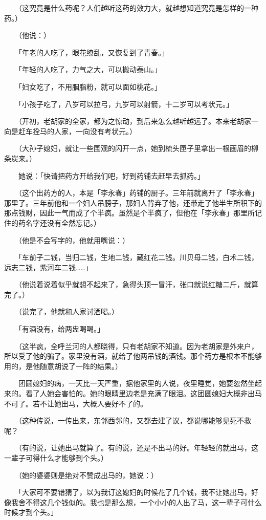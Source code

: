 \documentclass[UTF8]{ctexart}
\begin{document}
　　（这究竟是什么药呢？人们越听这药的效力大，就越想知道究竟是怎样的一种药。）

　　（他说：）

　　「年老的人吃了，眼花缭乱，又恢复到了青春。」

　　「年轻的人吃了，力气之大，可以搬动泰山。」

　　「妇女吃了，不用胭脂粉，就可以面如桃花。」

　　「小孩子吃了，八岁可以拉弓，九岁可以射箭，十二岁可以考状元。」

　　（开初，老胡家的全家，都为之惊动，到后来怎么越听越远了。本来老胡家一向是赶车拴马的人家，一向没有考状元。）

　　（大孙子媳妇，就让一些围观的闪开一点，她到梳头匣子里拿出一根画眉的柳条炭来。）

　　她说：「快请把药方开给我们吧，好到药铺去赶早去抓药。」

　　（这个出药方的人，本是「李永春」药铺的厨子。三年前就离开了「李永春」那里了。三年前他和一个妇人吊膀子，那妇人背弃了他，还带走了他半生所积下的那点钱财，因此一气而成了个半疯。虽然是个半疯了，但他在「李永春」那里所记住的药名字还没有全然忘记。）

　　（他是不会写字的，他就用嘴说：）

　　「车前子二钱，当归二钱，生地二钱，藏红花二钱。川贝母二钱，白术二钱，远志二钱，紫河车二钱……」

　　（他说着说着似乎就想不起来了，急得头顶一冒汗，张口就说红糖二斤，就算完了。）

　　（说完了，他就和人家讨酒喝。）

　　「有酒没有，给两盅喝喝。」

　　（这半疯，全呼兰河的人都晓得，只有老胡家不知道。因为老胡家是外来户，所以受了他的骗了。家里没有酒，就给了他两吊钱的酒钱。那个药方是根本不能够用的，是他随意胡说了一阵的结果。）

　　团圆媳妇的病，一天比一天严重，据他家里的人说，夜里睡觉，她要忽然坐起来的。看了人她会害怕的。她的眼睛里边老是充满了眼泪。这团圆媳妇大概非出马不可了。若不让她出马，大概人要好不了的。

　　（这种传说，一传出来，东邻西邻的，又都去建了议，都说哪能够见死不救呢？

　　（有的说，让她出马就算了。有的说，还是不出马的好。年轻轻的就出马，这一辈子可得什么才能够到个头。）

　　（她的婆婆则是绝对不赞成出马的，她说：）

　　「大家可不要错猜了，以为我订这媳妇的时候花了几个钱，我不让她出马，好像我舍不得这几个钱似的。我也是那么想，一个小小的人出了马，这一辈子可什么时候才到个头。」
\end{document}
